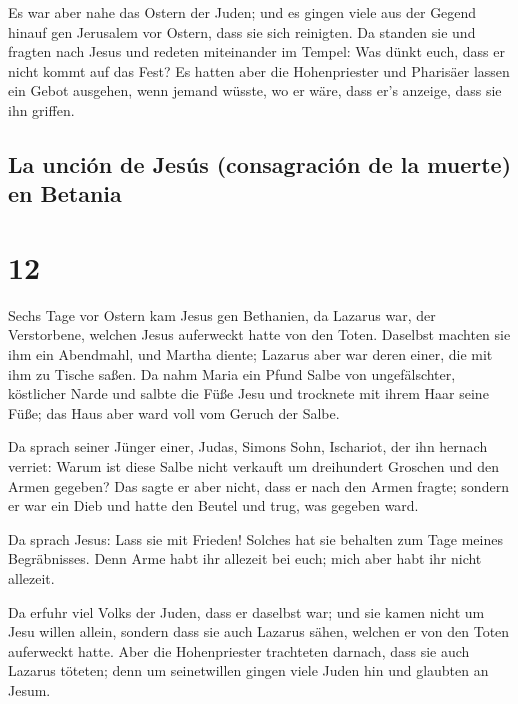  Es war aber nahe das Ostern der Juden; und es gingen
viele aus der Gegend hinauf gen Jerusalem vor Ostern, dass sie sich
reinigten.  Da standen sie und fragten nach Jesus und
redeten miteinander im Tempel: Was dünkt euch, dass er nicht kommt auf
das Fest?  Es hatten aber die Hohenpriester und Pharisäer
lassen ein Gebot ausgehen, wenn jemand wüsste, wo er wäre, dass er's
anzeige, dass sie ihn griffen.

\hypertarget{la-unciuxf3n-de-jesuxfas-consagraciuxf3n-de-la-muerte-en-betania}{%
\subsection{La unción de Jesús (consagración de la muerte) en
Betania}\label{la-unciuxf3n-de-jesuxfas-consagraciuxf3n-de-la-muerte-en-betania}}

\hypertarget{section-11}{%
\section{12}\label{section-11}}

 Sechs Tage vor Ostern kam Jesus gen Bethanien, da Lazarus
war, der Verstorbene, welchen Jesus auferweckt hatte von den Toten.
 Daselbst machten sie ihm ein Abendmahl, und Martha
diente; Lazarus aber war deren einer, die mit ihm zu Tische saßen.
 Da nahm Maria ein Pfund Salbe von ungefälschter,
köstlicher Narde und salbte die Füße Jesu und trocknete mit ihrem Haar
seine Füße; das Haus aber ward voll vom Geruch der Salbe.

 Da sprach seiner Jünger einer, Judas, Simons Sohn,
Ischariot, der ihn hernach verriet:  Warum ist diese Salbe
nicht verkauft um dreihundert Groschen und den Armen gegeben?
 Das sagte er aber nicht, dass er nach den Armen fragte;
sondern er war ein Dieb und hatte den Beutel und trug, was gegeben ward.

 Da sprach Jesus: Lass sie mit Frieden! Solches hat sie
behalten zum Tage meines Begräbnisses.  Denn Arme habt ihr
allezeit bei euch; mich aber habt ihr nicht allezeit.

 Da erfuhr viel Volks der Juden, dass er daselbst war; und
sie kamen nicht um Jesu willen allein, sondern dass sie auch Lazarus
sähen, welchen er von den Toten auferweckt hatte.  Aber
die Hohenpriester trachteten darnach, dass sie auch Lazarus töteten;
 denn um seinetwillen gingen viele Juden hin und glaubten
an Jesum.

